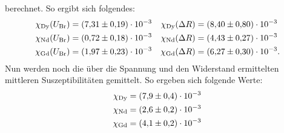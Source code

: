 berechnet.
So ergibt sich folgendes:
\begin{align*}
  \chi_\text{Dy}(U_\text{Br}) &= \SI{7.31\pm0.19e-3}{} & \chi_\text{Dy}(\Delta R) &= \SI{8.40\pm0.80e-3}{}\\
  \chi_\text{Nd}(U_\text{Br}) &= \SI{0.72\pm0.18e-3}{} & \chi_\text{Nd}(\Delta R) &= \SI{4.43\pm0.27e-3}{}\\
  \chi_\text{Gd}(U_\text{Br}) &= \SI{1.97\pm0.23e-3}{} & \chi_\text{Gd}(\Delta R) &= \SI{6.27\pm0.30e-3}{} .
\end{align*}
Nun werden noch die über die Spannung und den Widerstand ermittelten mittleren Suszeptibilitäten gemittelt.
So ergeben sich folgende Werte:
\begin{align*}
  \chi_\text{Dy} &= \SI{7.9\pm0.4e-3}{} \\
  \chi_\text{Nd} &= \SI{2.6\pm0.2e-3}{} \\
  \chi_\text{Gd} &= \SI{4.1\pm0.2e-3}{}
\end{align*}
